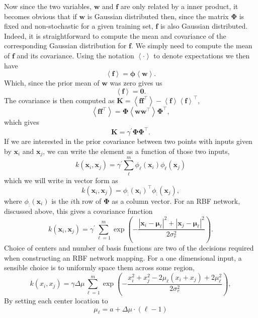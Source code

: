 Now since the two variables, $\mathbf{w}$ and $\mathbf{f}$ are only
related by a inner product, it becomes obvious that if $\mathbf{w}$ is
Gaussian distributed then, since the matrix $\boldsymbol{\Phi}$ is
fixed and non-stochastic for a given training set, $\mathbf{f}$ is
also Gaussian distributed. Indeed, it is straightforward to compute
the mean and covariance of the corresponding Gaussian distribution for
$\mathbf{f}$. We simply need to compute the mean of $\mathbf{f}$ and
its covariance. Using the notation $\left\langle \cdot \right\rangle$
to denote expectations we then have
\[
\left\langle\mathbf{f}\right\rangle =
\boldsymbol{\phi}\left\langle\mathbf{w}\right\rangle.
\]
Which, since the prior mean of $\mathbf{w}$ was zero gives us 
\[
\left\langle\mathbf{f}\right\rangle = \mathbf{0}.
\]
The covariance is then computed as $\mathbf{K}=\left\langle
  \mathbf{f}\mathbf{f}^\top\right\rangle -
\left\langle\mathbf{f}\right\rangle\left\langle\mathbf{f}\right\rangle^\top$,
\[
\left\langle \mathbf{f}\mathbf{f}^\top\right\rangle = \boldsymbol{\Phi}\left\langle\mathbf{w}\mathbf{w}^\top\right\rangle\boldsymbol{\Phi}^\top, 
\]
which gives
\[
\mathbf{K} = \gamma^\prime \boldsymbol{\Phi}\boldsymbol{\Phi}^\top.
\]
If we are interested in the prior covariance between two points with
inputs given by $\mathbf{x}_i$ and $\mathbf{x}_j$, we can write the
element as a function of those two inputs,
\[
k\left(\mathbf{x}_i,\mathbf{x}_j\right) = \gamma^\prime \sum_{\ell}^{m} \phi_\ell\left(\mathbf{x}_i\right) \phi_\ell\left(\mathbf{x}_j\right)
\]  
which we will write in vector form as
\[
k\left(\mathbf{x}_i,\mathbf{x}_j\right)=\phi_:\left(\mathbf{x}_i\right)^\top\phi_:\left(\mathbf{x}_j\right), \label{eq:degenerateCovariance}
\]
where $\phi_:\left(\mathbf{x}_i\right)$ is the $i$th row of
$\boldsymbol{\Phi}$ as a column vector. For an RBF network, discussed
above, this gives a covariance function
\[
k\left(\mathbf{x}_i,\mathbf{x}_j\right) = \gamma^\prime
\sum_{\ell=1}^{m} \exp\left( -\frac{\left\vert \mathbf{x}_i -
      \boldsymbol{\mu}_\ell\right\vert^2 + \left\vert \mathbf{x}_j -
      \boldsymbol{\mu}_\ell\right\vert^2}{2 \sigma_r^2} \right).
\]
Choice of centers and number of basis functions are two of the
decisions required when constructing an RBF network mapping. For a one
dimensional input, a sensible choice is to uniformly space them across
some region,
\[
k\left(x_i,x_j\right) = \gamma\Delta\mu \sum_{\ell=1}^{m} \exp\left(
  -\frac{x^2_i + x^2_j - 2\mu_\ell \left(x_i+x_j\right) +
    2\mu_\ell^2}{2 \sigma_r^2} \right),
\]
By setting each center location to
\[
\mu_\ell = a+\Delta\mu\cdot (\ell-1)
\]

